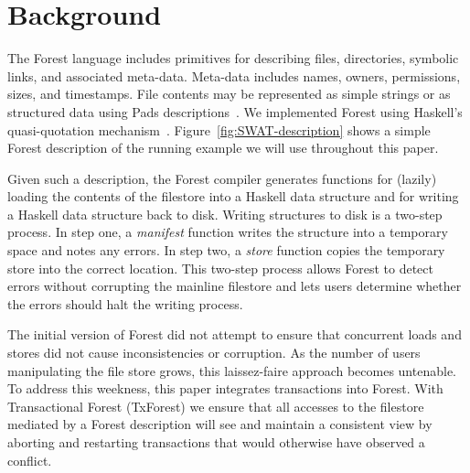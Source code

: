 \section{Background}
\label{sec:Background}


The Forest language includes primitives for describing files,
directories, symbolic links, and associated meta-data.  Meta-data
includes names, owners, permissions, sizes, and timestamps.  File
contents may be represented as simple strings or as structured data
using Pads descriptions~\cite{fisher+:pads,fisher-walker:icdt}.  We implemented Forest using
Haskell's quasi-quotation mechanism~\cite{Mainland:quasi}.
Figure~\ref{fig:SWAT-description} shows a simple Forest
description of the running example we will use throughout this paper.

Given such a description, the Forest compiler generates functions for
(lazily) loading the contents of the filestore into a Haskell data
structure and for writing a Haskell data structure back to disk.
Writing structures to disk is a two-step process.  In step one, a
\textit{manifest} function writes the structure into a temporary space
and notes any errors.  In step two, a \textit{store} function copies
the temporary store into the correct location.  This two-step process
allows Forest to detect errors without corrupting the mainline
filestore and lets users determine whether the errors should halt the
writing process.

The initial version of Forest did not attempt to ensure that 
concurrent loads and stores did not cause inconsistencies or
corruption.  As the number of users manipulating the file store grows,
this laissez-faire approach becomes untenable.  To address this
weekness, this paper integrates transactions into Forest.  With
Transactional Forest (TxForest) we ensure that all accesses to the
filestore mediated by a Forest description will see and maintain a
consistent view by aborting and restarting transactions that would
otherwise have observed a conflict.

